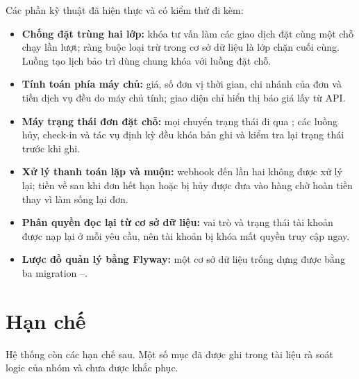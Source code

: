 Các phần kỹ thuật đã hiện thực và có kiểm thử đi kèm:
\begin{itemize}
    \item \textbf{Chống đặt trùng hai lớp:} khóa tư vấn làm các giao dịch đặt cùng một chỗ chạy lần lượt; ràng buộc loại trừ trong cơ sở dữ liệu là lớp chặn cuối cùng. Luồng tạo lịch bảo trì dùng chung khóa với luồng đặt chỗ.
    \item \textbf{Tính toán phía máy chủ:} giá, số đơn vị thời gian, chi nhánh của đơn và tiền dịch vụ đều do máy chủ tính; giao diện chỉ hiển thị báo giá lấy từ API.
    \item \textbf{Máy trạng thái đơn đặt chỗ:} mọi chuyển trạng thái đi qua ; các luồng hủy, check-in và tác vụ định kỳ đều khóa bản ghi và kiểm tra lại trạng thái trước khi ghi.
    \item \textbf{Xử lý thanh toán lặp và muộn:} webhook đến lần hai không được xử lý lại; tiền về sau khi đơn hết hạn hoặc bị hủy được đưa vào hàng chờ hoàn tiền thay vì làm sống lại đơn.
    \item \textbf{Phân quyền đọc lại từ cơ sở dữ liệu:} vai trò và trạng thái tài khoản được nạp lại ở mỗi yêu cầu, nên tài khoản bị khóa mất quyền truy cập ngay.
    \item \textbf{Lược đồ quản lý bằng Flyway:} một cơ sở dữ liệu trống dựng được bằng ba migration --.
\end{itemize}

\section{Hạn chế}
\label{sec:tk-han-che}

Hệ thống còn các hạn chế sau. Một số mục đã được ghi trong tài liệu rà soát logic của nhóm và chưa được khắc phục.

